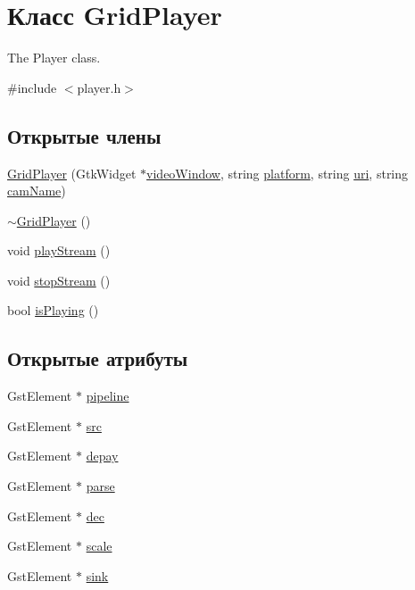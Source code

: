 \hypertarget{class_grid_player}{}\section{Класс Grid\+Player}
\label{class_grid_player}


The Player class.  




{\ttfamily \#include $<$player.\+h$>$}

\subsection*{Открытые члены}
\begin{DoxyCompactItemize}
\item 
\hyperlink{class_grid_player_a670153ae435e91f320cfeccf32e47aa1}{Grid\+Player} (Gtk\+Widget $\ast$\hyperlink{class_grid_player_a582df2d5915ae3c58a66c62c107fad96}{video\+Window}, string \hyperlink{class_grid_player_a694c70fa87a2c02929cd9c9fe5018b49}{platform}, string \hyperlink{class_grid_player_ae5257afc53ae7449800702444cbdd484}{uri}, string \hyperlink{class_grid_player_abc88f204b5eac4b1e46618375bd02a1c}{cam\+Name})
\item 
\hyperlink{class_grid_player_a4f64638cfd503340e6cf35a2991b449e}{$\sim$\+Grid\+Player} ()
\item 
void \hyperlink{class_grid_player_a8a0d4770b337b17621cd396ac2a06357}{play\+Stream} ()
\item 
void \hyperlink{class_grid_player_a85388a3706fef41f2c6145d17f8dfd39}{stop\+Stream} ()
\item 
bool \hyperlink{class_grid_player_a90e8bed2e7bd8c83dfc9aa5c7d9c7135}{is\+Playing} ()
\end{DoxyCompactItemize}
\subsection*{Открытые атрибуты}
\begin{DoxyCompactItemize}
\item 
Gst\+Element $\ast$ \hyperlink{class_grid_player_a9659d4e2d368e117f7b0e7c6c1095311}{pipeline}
\item 
Gst\+Element $\ast$ \hyperlink{class_grid_player_a6c6ceb002f92458fa5daa5cd3109a5e1}{src}
\item 
Gst\+Element $\ast$ \hyperlink{class_grid_player_a38f951544cf0ffd817f8a0022ced9877}{depay}
\item 
Gst\+Element $\ast$ \hyperlink{class_grid_player_a872ad28932a21f13e72ddae641913374}{parse}
\item 
Gst\+Element $\ast$ \hyperlink{class_grid_player_a35a75c9700b2dc6ed5d90dc06bc71169}{dec}
\item 
Gst\+Element $\ast$ \hyperlink{class_grid_player_ad704e67598a7f8b0d9c88406eb27f176}{scale}
\item 
Gst\+Element $\ast$ \hyperlink{class_grid_player_ad9eaab5a291f3bd2c671fdb86d72d522}{sink}
\end{DoxyCompactItemize}
